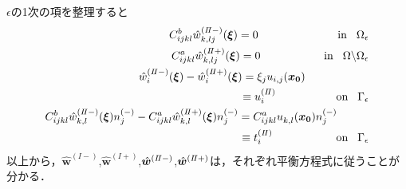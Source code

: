 $\epsilon$の1次の項を整理すると
\begin{align}
	C_{ijkl}^{b} \hat{w}^{(I\hspace{-.15em}I-)}_{k,lj}(\bm{\xi})=0
	\hspace{2.5cm}
	\text{in}\hspace{0.3cm}\Omega_{\epsilon}
	\label{eq:GovDisturIn2}
	\\
	C_{ijkl}^{a} \hat{w}^{(I\hspace{-.15em}I+)}_{k,lj}(\bm{\xi})=0
	\hspace{2.0cm}
	\text{in}\hspace{0.3cm}\Omega\backslash\Omega_{\epsilon}
	\label{eq:GovDisturOut2}
	\\
	\hat{w}_{i}^{(I\hspace{-.15em}I-)}(\bm{\xi})
	-\hat{w}_{i}^{(I\hspace{-.15em}I+)}(\bm{\xi})= \xi_j u_{i,j}(\bm{x_0})
	\hspace{2.0cm}
	\nonumber
	\\
	\equiv u_{i}^{(I\hspace{-.15em}I)}
	\hspace{1.9cm}\text{on}\hspace{0.3cm}\Gamma_{\epsilon}
	\label{eq:GovDisturUBC2}
	\\
	C_{ijkl}^{b}\hat{w}_{k,l}^{(I\hspace{-.15em}I-)}(\bm{\xi})n_{j}^{(-)}
	-C_{ijkl}^{a}\hat{w}_{k,l}^{(I\hspace{-.15em}I+)}(\bm{\xi})n_{j}^{(-)}
	=C_{ijkl}^{a} u_{k,l}^{}(\bm{x_0})n_{j}^{(-)}
	\hspace{1.0cm}
	\nonumber
	\\
	\equiv t_{i}^{(I\hspace{-.15em}I)}
	\hspace{2.0cm}\text{on}\hspace{0.3cm}\Gamma_{\epsilon}
	\label{eq:GovDisturSBC2}
\end{align}
以上から，$\hat{\bm{w}}^{(I-)}$,$\hat{\bm{w}}^{(I+)}$,$\hat{\bm{w}}^{(I\hspace{-.15em}I-)}$,$\hat{\bm{w}}^{(I\hspace{-.15em}I+)}$は，それぞれ平衡方程式に従うことが分かる．

\newpage
